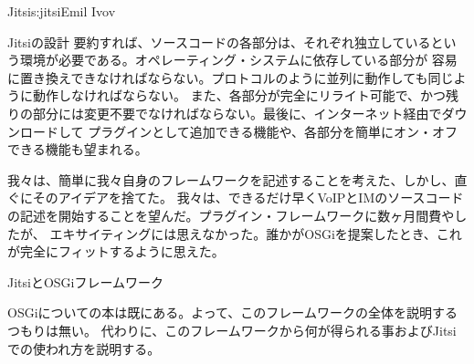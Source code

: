 \begin{aosachapter}{Jitsi}{s:jitsi}{Emil Ivov}
\begin{aosasect1}{Jitsiの設計}
要約すれば、ソースコードの各部分は、それぞれ独立しているという環境が必要である。オペレーティング・システムに依存している部分が
容易に置き換えできなければならない。プロトコルのように並列に動作しても同じように動作しなければならない。
また、各部分が完全にリライト可能で、かつ残りの部分には変更不要でなければならない。最後に、インターネット経由でダウンロードして
プラグインとして追加できる機能や、各部分を簡単にオン・オフできる機能も望まれる。

我々は、簡単に我々自身のフレームワークを記述することを考えた、しかし、直ぐにそのアイデアを捨てた。
我々は、できるだけ早くVoIPとIMのソースコードの記述を開始することを望んだ。プラグイン・フレームワークに数ヶ月間費やしたが、
エキサイティングには思えなかった。誰かがOSGiを提案したとき、これが完全にフィットするように思えた。

\end{aosasect1}

\begin{aosasect1}{JitsiとOSGiフレームワーク}

OSGiについての本は既にある。よって、このフレームワークの全体を説明するつもりは無い。
代わりに、このフレームワークから何が得られる事およびJitsiでの使われ方を説明する。


\end{aosasect1}
\end{aosachapter}

